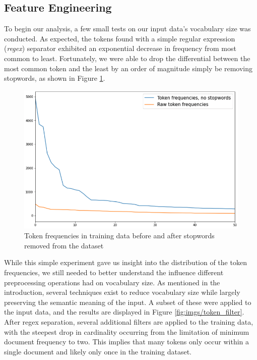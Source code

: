 \documentclass[11pt,a4paper]{article}
\begin{document}
\subsection{Feature Engineering}%
\label{sub:feature_engineering}

To begin our analysis, a few small tests on our input data's vocabulary size was conducted. As expected, the tokens found with a simple regular expression (\textit{regex})  separator exhibited an exponential decrease in frequency from most common to least. Fortunately, we were able to drop the differential between the most common token and the least by an order of magnitude simply be removing stopwords, as shown in Figure \ref{fig:stopwords}.

\begin{figure}[htpb]
  \centering
  \includegraphics[width=1\linewidth]{imgs/stopwords.png}
  \caption{Token frequencies in training data before and after 
  stopwords removed from the dataset}%
  \label{fig:stopwords}
\end{figure}

While this simple experiment gave us insight into the distribution of the token frequencies, we still needed to better understand the influence different preprocessing operations had on vocabulary size. As mentioned in the introduction, several techniques exist to reduce vocabulary size while largely preserving the semantic meaning of the input. A subset of these were applied to the input data, and the results are displayed in Figure \ref{fig:imgs/token_filter}. After regex separation, several additional filters are applied to the training data, with the steepest drop in cardinality occurring from the limitation of minimum document frequency to two. This implies that many tokens only occur within a single document and likely only once in the training dataset. 
\end{document}
